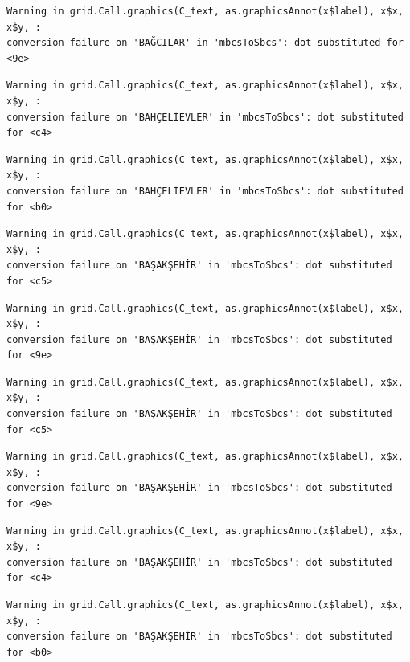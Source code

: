 \documentclass[
  11pt,
  a4paper,
  DIV=11,
  numbers=noendperiod]{scrartcl}
\begin{document}
\begin{verbatim}
Warning in grid.Call.graphics(C_text, as.graphicsAnnot(x$label), x$x, x$y, :
conversion failure on 'BAĞCILAR' in 'mbcsToSbcs': dot substituted for <9e>
\end{verbatim}

\begin{verbatim}
Warning in grid.Call.graphics(C_text, as.graphicsAnnot(x$label), x$x, x$y, :
conversion failure on 'BAHÇELİEVLER' in 'mbcsToSbcs': dot substituted for <c4>
\end{verbatim}

\begin{verbatim}
Warning in grid.Call.graphics(C_text, as.graphicsAnnot(x$label), x$x, x$y, :
conversion failure on 'BAHÇELİEVLER' in 'mbcsToSbcs': dot substituted for <b0>
\end{verbatim}

\begin{verbatim}
Warning in grid.Call.graphics(C_text, as.graphicsAnnot(x$label), x$x, x$y, :
conversion failure on 'BAŞAKŞEHİR' in 'mbcsToSbcs': dot substituted for <c5>
\end{verbatim}

\begin{verbatim}
Warning in grid.Call.graphics(C_text, as.graphicsAnnot(x$label), x$x, x$y, :
conversion failure on 'BAŞAKŞEHİR' in 'mbcsToSbcs': dot substituted for <9e>
\end{verbatim}

\begin{verbatim}
Warning in grid.Call.graphics(C_text, as.graphicsAnnot(x$label), x$x, x$y, :
conversion failure on 'BAŞAKŞEHİR' in 'mbcsToSbcs': dot substituted for <c5>
\end{verbatim}

\begin{verbatim}
Warning in grid.Call.graphics(C_text, as.graphicsAnnot(x$label), x$x, x$y, :
conversion failure on 'BAŞAKŞEHİR' in 'mbcsToSbcs': dot substituted for <9e>
\end{verbatim}

\begin{verbatim}
Warning in grid.Call.graphics(C_text, as.graphicsAnnot(x$label), x$x, x$y, :
conversion failure on 'BAŞAKŞEHİR' in 'mbcsToSbcs': dot substituted for <c4>
\end{verbatim}

\begin{verbatim}
Warning in grid.Call.graphics(C_text, as.graphicsAnnot(x$label), x$x, x$y, :
conversion failure on 'BAŞAKŞEHİR' in 'mbcsToSbcs': dot substituted for <b0>
\end{verbatim}
\end{document}
